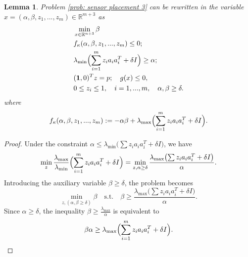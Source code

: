 \documentclass[10pt,a4paper]{amsart}
\newtheorem{lemma}{Lemma}
\begin{document}
\begin{lemma}
 Problem \eqref{prob: sensor placement 3} can be rewritten in the variable $x = (\alpha, \beta, z_1,...,z_m) \in \mathbb{R}^{m+3}$ as
\begin{equation}
\label{prob: SL3 not final}
\begin{split}
& \min_{x \in \mathbb{R}^{n+3}} \beta \\
& f_\kappa(\alpha, \beta, z_1,...,z_m)\le 0; \\
& \lambda_{\min}\Bigl( \sum_{i=1}^m z_i a_i a_i^T + \delta I \Bigr) \ge \alpha; \\
& (\mathbf{1},0)^T z = p;\quad g(x)\le 0, \\
& 0\le z_i \le 1,\quad i=1,...,m, \quad \alpha,\beta \ge \delta.
\end{split}
\end{equation}
where
\begin{equation}
\label{prob: functionss}
f_\kappa(\alpha, \beta, z_1,...,z_m) := -\alpha\beta + \lambda_{\max}\Bigl( \sum_{i=1}^m z_i a_i a_i^T + \delta I \Bigr).
\end{equation}
\end{lemma}

\begin{proof}
Under the constraint $\alpha \le \lambda_{\min}\bigl(\sum z_i a_i a_i^T + \delta I\bigr)$, we have
\[
\min_z \frac{\lambda_{\max}}{\lambda_{\min}}\Bigl( \sum_{i=1}^m z_i a_i a_i^T + \delta I \Bigr) = \min_{z,\alpha\ge\delta} \frac{\lambda_{\max}\bigl(\sum z_i a_i a_i^T + \delta I\bigr)}{\alpha}.
\]
Introducing the auxiliary variable $\beta \ge \delta$, the problem becomes
\begin{equation}
\label{eq: beta}
\min_{z,(\alpha,\beta\ge\delta)} \beta \quad\text{s.t.}\quad \beta \ge \frac{\lambda_{\max}\bigl(\sum z_i a_i a_i^T + \delta I\bigr)}{\alpha}.
\end{equation}
Since $\alpha \ge \delta$, the inequality $\beta \ge \frac{\lambda_{\max}}{\alpha}$ is equivalent to
\[
\beta\alpha \ge \lambda_{\max}\Bigl( \sum_{i=1}^m z_i a_i a_i^T + \delta I \Bigr).
\]
\end{proof}
\end{document}
